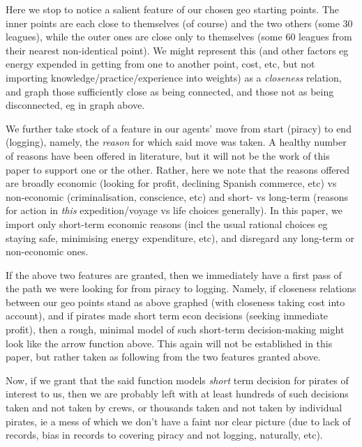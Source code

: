 \documentclass{amsart}
\newcommand{\mention}[1]{\textit{#1}}%
\theoremstyle{definition}%
\theoremstyle{definition}%
\theoremstyle{remark}%
\theoremstyle{definition}%
\theoremstyle{definition}%
\begin{document}
Here we stop to notice a salient feature of our chosen geo starting points. The inner points are each close to themselves (of course) and the two others (some 30 leagues), while the outer ones are close only to themselves (some 60 leagues from their nearest non-identical point). We might represent this (and other factors eg energy expended in getting from one to another point, cost, etc, but not importing knowledge/practice/experience into weights) as a \mention{closeness} relation, and graph those sufficiently close as being connected, and those not as being disconnected, eg in graph above.

We further take stock of a feature in our agents' move from start (piracy) to end (logging), namely, the \emph{reason} for which said move was taken. A healthy number of reasons have been offered in literature, but it will not be the work of this paper to support one or the other. Rather, here we note that the reasons offered are broadly economic (looking for profit, declining Spanish commerce, etc) vs non-economic (criminalisation, conscience, etc) and short- vs long-term (reasons for action in \emph{this} expedition/voyage vs life choices generally). In this paper, we import only short-term economic reasons (incl the usual rational choices eg staying safe, minimising energy expenditure, etc), and disregard any long-term or non-economic ones.%

If the above two features are granted, then we immediately have a first pass of the path we were looking for from piracy to logging. Namely, if closeness relations between our geo points stand as above graphed (with closeness taking cost into account), and if pirates made short term econ decisions (seeking immediate profit), then a rough, minimal model of such short-term decision-making might look like the arrow function above. This again will not be established in this paper, but rather taken as following from the two features granted above.%

Now, if we grant that the said function models \emph{short} term decision for pirates of interest to us, then we are probably left with at least hundreds of such decisions taken and not taken by crews, or thousands taken and not taken by individual pirates, ie a mess of which we don't have a faint nor clear picture (due to lack of records, bias in records to covering piracy and not logging, naturally, etc).
\end{document}
